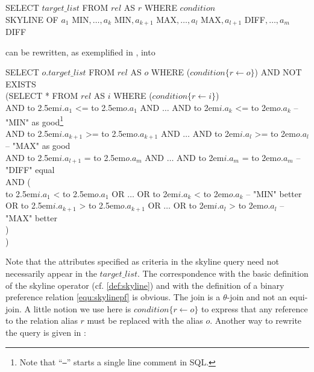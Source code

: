 \begin{sql}
SELECT $target\_list$ FROM $rel$ AS $r$ WHERE $condition$ \\
SKYLINE OF $a_1$ MIN$, \ldots, a_k$ MIN$, a_{k+1}$ MAX$, \ldots, a_l$ MAX$, a_{l+1}$ DIFF$, \ldots, a_m$ DIFF
\end{sql}
%
can be rewritten, as exemplified in \citep{Borzsonyi2001}, into
%
\begin{sql}\label{sql:rewritten-non-distinct}
\newcommand\abox[1]{\hbox to 2.5em{#1\hfil}}%
\newcommand\bbox[1]{\hbox to 2em{#1\hfil}}%
SELECT $o.target\_list$ FROM $rel$ AS $o$ WHERE ($condition\{r \gets o\}$) AND NOT EXISTS \\
(SELECT * FROM $rel$ AS $i$ WHERE ($condition\{r \gets i\}$) \\
AND \abox{$i.a_1$} <= \abox{$o.a_1$} AND $\ldots$ AND \bbox{$i.a_k$} <= \bbox{$o.a_k$} -- "MIN" as good\footnote{Note that ``\texttt{--}'' starts a single line comment in SQL.}\\
AND \abox{$i.a_{k+1}$} >= \abox{$o.a_{k+1}$} AND $\ldots$ AND \bbox{$i.a_l$} >= \bbox{$o.a_l$} -- "MAX" as good\\
AND \abox{$i.a_{l+1}$} { }= \abox{$o.a_m$} AND $\ldots$ AND \bbox{$i.a_m$} { }= \bbox{$o.a_m$} -- "DIFF" equal \\
AND (\\
\phantom{{ }{ }{ }}\abox{$i.a_1$} < \abox{$o.a_1$} OR $\ldots$ OR \bbox{$i.a_k$} < \bbox{$o.a_k$} -- "MIN" better \\
OR \abox{$i.a_{k+1}$} > \abox{$o.a_{k+1}$} OR $\ldots$ OR \bbox{$i.a_l$} > \bbox{$o.a_l$} -- "MAX" better \\
)\\
)
\end{sql}

Note that the attributes specified as criteria in the skyline query
need not necessarily appear in the $target\_list$.
%
The correspondence with the basic definition of the skyline operator
(cf. \autoref{def:skyline}) and with the definition of a binary
preference relation \eqref{equ:skylinepf} is obvious.
%
The join is a $\theta$-join and not an equi-join.
%
A little notion we use here is $condition\{r \gets o\}$ to express
that any reference to the relation alias $r$ must be replaced with
the alias $o$.
%
Another way to rewrite the query is given in
\citep[Page~3]{Godfrey2004}:

